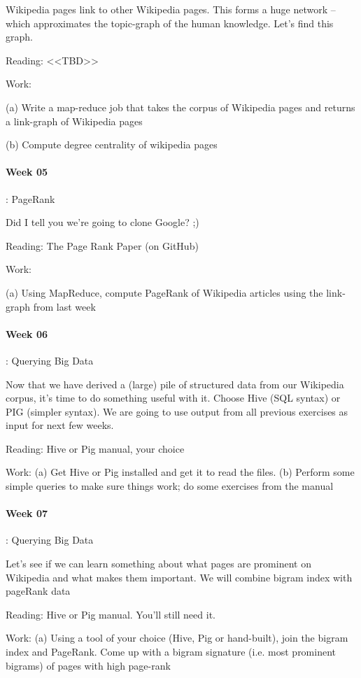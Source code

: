 \documentclass[12pt]{article}
\begin{document}
Wikipedia pages link to other Wikipedia pages. This forms a huge network -- which approximates the topic-graph of the human knowledge. Let's find this graph. 

Reading: <<TBD>>

Work:

(a) Write a map-reduce job that takes the corpus of Wikipedia pages and returns a link-graph of Wikipedia pages

(b) Compute degree centrality of wikipedia pages

\paragraph{Week 05}: PageRank

Did I tell you we're going to clone Google? ;)

Reading: The Page Rank Paper (on GitHub)

Work:

(a) Using MapReduce, compute PageRank of Wikipedia articles using the link-graph from last week

\paragraph{Week 06}: Querying Big Data

Now that we have derived a (large) pile of structured data from our Wikipedia corpus, it's time to do something useful with it. Choose Hive (SQL syntax) or PIG (simpler syntax). 
We are going to use output from all previous exercises as input for next few weeks.

Reading: 
Hive or Pig manual, your choice

Work: 
(a) Get Hive or Pig installed and get it to read the files. 
(b) Perform some simple queries to make sure things work; do some exercises from the manual

\paragraph{Week 07}: Querying Big Data

Let's see if we can learn something about what pages are prominent on Wikipedia and what makes them important. We will combine bigram index with pageRank data

Reading:
Hive or Pig manual. You'll still need it.

Work:
(a) Using a tool of your choice (Hive, Pig or hand-built), join the bigram index and PageRank. Come up with a bigram signature (i.e. most prominent bigrams) of pages with high page-rank
\end{document}
